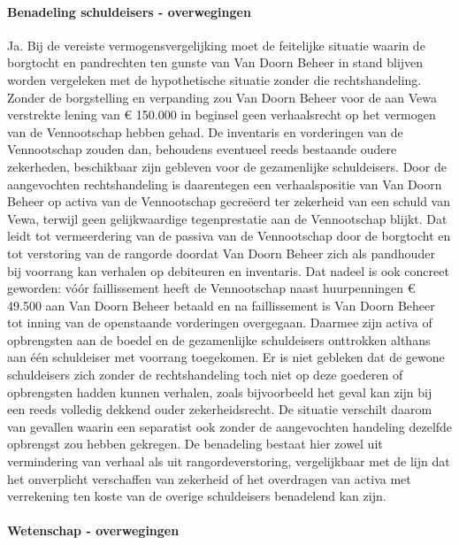 \documentclass[
  dutch,
  a4paper,
]{article}
\begin{document}
\paragraph{Benadeling schuldeisers - overwegingen}\label{benadeling-schuldeisers---overwegingen-4}

Ja. Bij de vereiste vermogensvergelijking moet de feitelijke situatie waarin de borgtocht en pandrechten ten gunste van Van Doorn Beheer in stand blijven worden vergeleken met de hypothetische situatie zonder die rechtshandeling. Zonder de borgstelling en verpanding zou Van Doorn Beheer voor de aan Vewa verstrekte lening van € 150.000 in beginsel geen verhaalsrecht op het vermogen van de Vennootschap hebben gehad. De inventaris en vorderingen van de Vennootschap zouden dan, behoudens eventueel reeds bestaande oudere zekerheden, beschikbaar zijn gebleven voor de gezamenlijke schuldeisers. Door de aangevochten rechtshandeling is daarentegen een verhaalspositie van Van Doorn Beheer op activa van de Vennootschap gecreëerd ter zekerheid van een schuld van Vewa, terwijl geen gelijkwaardige tegenprestatie aan de Vennootschap blijkt. Dat leidt tot vermeerdering van de passiva van de Vennootschap door de borgtocht en tot verstoring van de rangorde doordat Van Doorn Beheer zich als pandhouder bij voorrang kan verhalen op debiteuren en inventaris. Dat nadeel is ook concreet geworden: vóór faillissement heeft de Vennootschap naast huurpenningen € 49.500 aan Van Doorn Beheer betaald en na faillissement is Van Doorn Beheer tot inning van de openstaande vorderingen overgegaan. Daarmee zijn activa of opbrengsten aan de boedel en de gezamenlijke schuldeisers onttrokken althans aan één schuldeiser met voorrang toegekomen. Er is niet gebleken dat de gewone schuldeisers zich zonder de rechtshandeling toch niet op deze goederen of opbrengsten hadden kunnen verhalen, zoals bijvoorbeeld het geval kan zijn bij een reeds volledig dekkend ouder zekerheidsrecht. De situatie verschilt daarom van gevallen waarin een separatist ook zonder de aangevochten handeling dezelfde opbrengst zou hebben gekregen. De benadeling bestaat hier zowel uit vermindering van verhaal als uit rangordeverstoring, vergelijkbaar met de lijn dat het onverplicht verschaffen van zekerheid of het overdragen van activa met verrekening ten koste van de overige schuldeisers benadelend kan zijn.

\paragraph{Wetenschap - overwegingen}\label{wetenschap---overwegingen-4}
\end{document}
